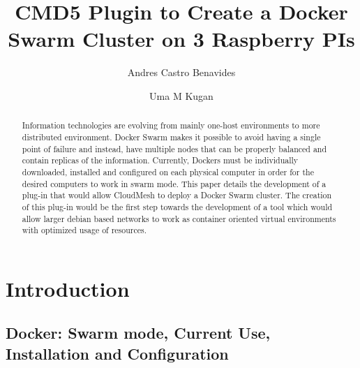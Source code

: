 
\title{CMD5 Plugin to Create a Docker Swarm Cluster on 3 Raspberry PIs}
	
%
%

	\author{Andres Castro Benavides}
	
	\author{Uma M Kugan}
	\renewcommand{\shortauthors}{Uma Kugan, Andres Castro}
  
\begin{abstract}
  Information technologies are evolving from mainly one-host
  environments to more distributed environment. Docker Swarm makes it
  possible to avoid having a single point of failure and instead, have
  multiple nodes that can be properly balanced and contain replicas of
  the information. Currently, Dockers must be individually downloaded,
  installed and configured on each physical computer in order for the
  desired computers to work in swarm mode. This paper details the
  development of a plug-in that would allow CloudMesh to deploy a
  Docker Swarm cluster.  The creation of this plug-in would be the
  first step towards the development of a tool which would allow
  larger debian based networks to work as container oriented virtual
  environments with optimized usage of resources.
\end{abstract}
	
	
\maketitle
	
\section{Introduction}
	


\subsection{Docker: Swarm mode, Current Use, Installation and
  Configuration}

